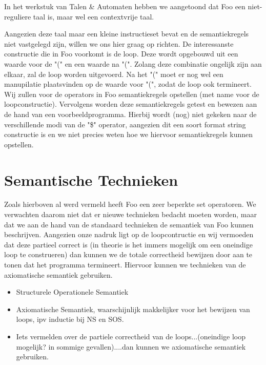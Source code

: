 \documentclass[11pt]{article}
\begin{document}
In het werkstuk van Talen \& Automaten hebben we aangetoond dat Foo een niet-reguliere taal is, maar wel een contextvrije taal.

Aangezien deze taal maar een kleine instructieset bevat en de semantiekregels niet vastgelegd zijn, willen we ons hier graag op richten.
De interessanste constructie die in Foo voorkomt is de loop.
Deze wordt opgebouwd uit een waarde voor de "(" en een waarde na "(".
Zolang deze combinatie ongelijk zijn aan elkaar, zal de loop worden uitgevoerd. Na het "(" moet er nog wel een manupilatie plaatsvinden op de waarde voor "(", zodat de loop ook termineert.
Wij zullen voor de operators in Foo semantiekregels opstellen (met name voor de loopconstructie). Vervolgens worden deze semantiekregels getest en bewezen aan de hand van een voorbeeldprogramma.
Hierbij wordt (nog) niet gekeken naar de verschillende modi van de "\$" operator, aangezien dit een soort format string constructie is en we niet precies weten hoe we hiervoor semantiekregels kunnen opstellen. %




\section{Semantische Technieken}

Zoals hierboven al werd vermeld heeft Foo een zeer beperkte set operatoren.
We verwachten daarom niet dat er nieuwe technieken bedacht moeten worden, maar dat we aan de hand van de standaard technieken de semantiek van Foo kunnen beschrijven.
Aangezien onze nadruk ligt op de loopcontructie en wij vermoeden dat deze partieel correct is (in theorie is het immers mogelijk om een oneindige loop te construeren) dan kunnen we de totale correctheid bewijzen door aan te tonen dat het programma termineert. Hiervoor kunnen we technieken van de axiomatische semantiek gebruiken.

\begin{itemize}
\item Structurele Operationele Semantiek
\item Axiomatische Semantiek, waarschijnlijk makkelijker voor het bewijzen van loops, ipv inductie bij NS en SOS.
\item Iets vermelden over de partiele correctheid van de loops...(oneindige loop mogelijk? in sommige gevallen)....dan kunnen we axiomatische semantiek gebruiken.
\end{itemize}
\end{document}

